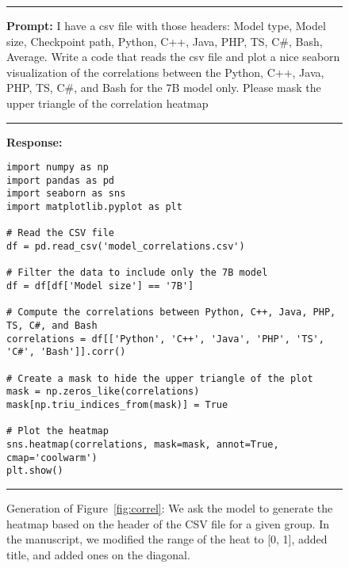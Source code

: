 \documentclass[10pt]{article}
\begin{document}
\begin{figure}
\vspace{-1.2cm}
\footnotesize
\noindent\rule{\textwidth}{1pt}
\textbf{Prompt:} I have a csv file with those headers: Model type, Model size, Checkpoint path, Python, C++, Java, PHP, TS, C\#, Bash, Average. Write a code that reads the csv file and plot a nice seaborn visualization of the correlations between the Python, C++, Java, PHP, TS, C\#, and Bash for the 7B model only. Please mask the upper triangle of the correlation heatmap \\
\noindent\rule{\textwidth}{1pt}
\textbf{Response: }
\begin{verbatim}
import numpy as np
import pandas as pd
import seaborn as sns
import matplotlib.pyplot as plt

# Read the CSV file
df = pd.read_csv('model_correlations.csv')

# Filter the data to include only the 7B model
df = df[df['Model size'] == '7B']

# Compute the correlations between Python, C++, Java, PHP, TS, C#, and Bash
correlations = df[['Python', 'C++', 'Java', 'PHP', 'TS', 'C#', 'Bash']].corr()

# Create a mask to hide the upper triangle of the plot
mask = np.zeros_like(correlations)
mask[np.triu_indices_from(mask)] = True

# Plot the heatmap
sns.heatmap(correlations, mask=mask, annot=True, cmap='coolwarm')
plt.show()
\end{verbatim}
\noindent\rule{\textwidth}{1pt}
\caption{Generation of Figure~\ref{fig:correl}: We ask the model to generate the heatmap based on the header of the CSV file for a given group. In the manuscript, we modified the range of the heat to [0, 1], added title, and added ones on the diagonal.}
\label{fig:code_corr}
\end{figure}

 
\end{document}

